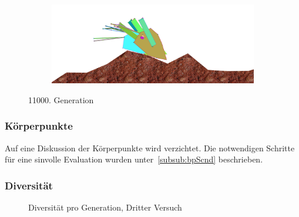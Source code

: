 \begin{figure}[H]
\begin{subfigure}[b]{0.45\textwidth}
              \includegraphics[width=\linewidth,center]{graphics/simulation-results/4_gen11000_4}
              \caption{\label{fig:gen11000_4}}
            \end{subfigure}
            \caption{11000. Generation \label{fig:gen11000}}
          \end{figure}

          \subsubsection{Körperpunkte}

            Auf eine Diskussion der Körperpunkte wird verzichtet.
            Die notwendigen Schritte für eine sinvolle Evaluation wurden unter~\vref{subsub:bpScnd} beschrieben.

          \subsubsection{Diversität}

            \begin{figure}
              \centering
              
              \caption{Diversität pro Generation, Dritter Versuch\label{fig:graphDivFourth}}
            \end{figure}
